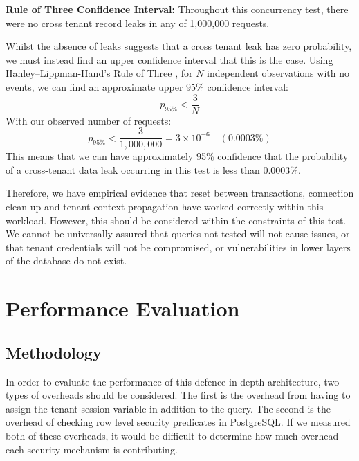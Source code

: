 \documentclass[conference]{IEEEtran}
\begin{document}
\textbf{Rule of Three Confidence Interval:} Throughout this concurrency test, there were no cross tenant record leaks in any of 1,000,000 requests.

Whilst the absence of leaks suggests that a cross tenant leak has zero probability, we must instead find an upper confidence interval that this is the case. Using Hanley--Lippman-Hand's Rule of Three \cite{hanley1983}, for $N$ independent observations with no events, we can find an approximate upper 95\% confidence interval:
\begin{equation}
p_{95\%} < \frac{3}{N}
\end{equation}
With our observed number of requests:
\begin{equation}
p_{95\%} < \frac{3}{1,000,000} = 3 \times 10^{-6} \quad (0.0003\%)
\end{equation}
This means that we can have approximately 95\% confidence that the probability of a cross-tenant data leak occurring in this test is less than 0.0003\%.

Therefore, we have empirical evidence that reset between transactions, connection clean-up and tenant context propagation have worked correctly within this workload. However, this should be considered within the constraints of this test. We cannot be universally assured that queries not tested will not cause issues, or that tenant credentials will not be compromised, or vulnerabilities in lower layers of the database do not exist.

\section{Performance Evaluation}
\label{sec:evaluation}

\subsection{Methodology}
In order to evaluate the performance of this defence in depth architecture, two types of overheads should be considered. The first is the overhead from having to assign the tenant session variable in addition to the query. The second is the overhead of checking row level security predicates in PostgreSQL. If we measured both of these overheads, it would be difficult to determine how much overhead each security mechanism is contributing.
\end{document}
